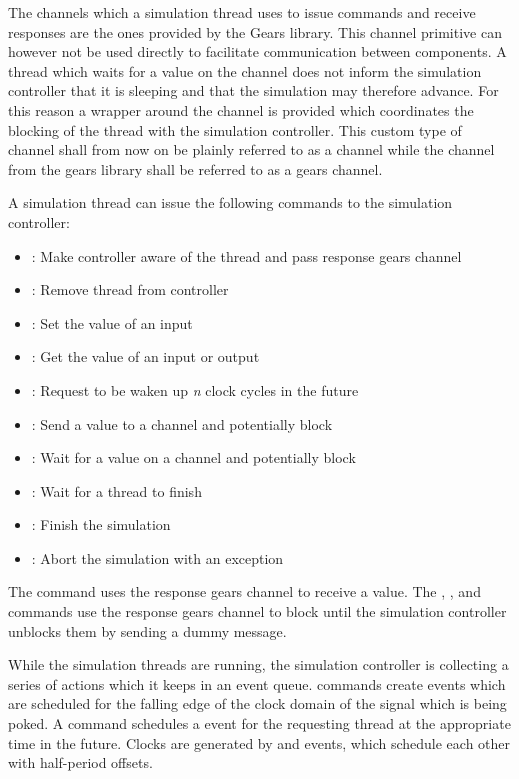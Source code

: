 The channels which a simulation thread uses to issue commands and receive responses are the ones provided by the
Gears library. This channel primitive can however not be used directly to facilitate communication between
components. A thread which waits for a value on the channel does not inform the simulation controller that it is
sleeping and that the simulation may therefore advance. For this reason a wrapper around the channel is provided
which coordinates the blocking of the thread with the simulation controller. This custom type of channel shall from
now on be plainly referred to as a channel while the channel from the gears library shall be referred to as a gears channel.

A simulation thread can issue the following commands to the simulation controller:

\begin{itemize}
  \item {}: Make controller aware of the thread and pass response gears channel
  \item {}: Remove thread from controller
  \item {}: Set the value of an input
  \item {}: Get the value of an input or output
  \item {}: Request to be waken up \textit{n} clock cycles in the future
  \item {}: Send a value to a channel and potentially block
  \item {}: Wait for a value on a channel and potentially block
  \item {}: Wait for a thread to finish
  \item {}: Finish the simulation
  \item {}: Abort the simulation with an exception
\end{itemize}

The  command uses the response gears channel to receive a value. The , ,
 and  commands use the response gears channel to block until the simulation
controller unblocks them by sending a dummy message.

While the simulation threads are running, the simulation controller is collecting a series of actions which it keeps
in an event queue.  commands create  events which are scheduled for the falling edge of the
clock domain of the signal which is being poked. A  command schedules a  event for the
requesting thread at the appropriate time in the future. Clocks are generated by  and 
events, which schedule each other with half-period offsets.

